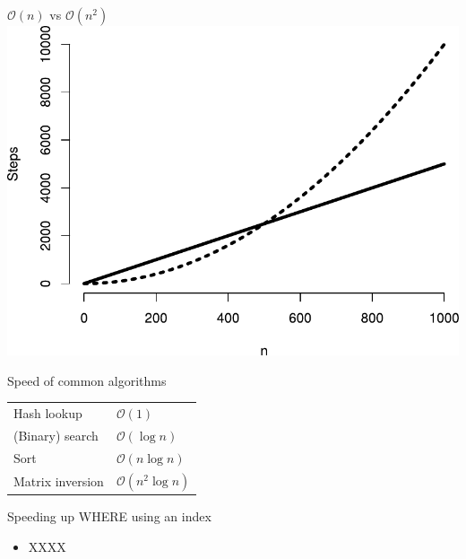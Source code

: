 \documentclass[aspectratio=169,12pt,usepdftitle=false]{beamer} %
\begin{document}
\begin{frame}{$\mathcal{O}(n)$ vs $\mathcal{O}(n^2)$}
\centering
\includegraphics[height=0.8\textheight]
	{ref/big-o-graph.pdf}
\end{frame}

\begin{frame}{Speed of common algorithms}
\centering
    \begin{tabular}{ll}
	Hash lookup & $\mathcal{O}(1)$ \\
	(Binary) search & $\mathcal{O}(\log{}n)$ \\
	Sort & $\mathcal{O}(n\log{}n)$ \\
	Matrix inversion & $\mathcal{O}(n^2\log{}n)$ \\ %
    \end{tabular}
\end{frame}

\begin{frame}{Speeding up WHERE using an index}
    \begin{itemize}
	\item XXXX
    \end{itemize}
\end{frame}

{
\begin{frame}[plain]
\end{frame}
}
\end{document}

